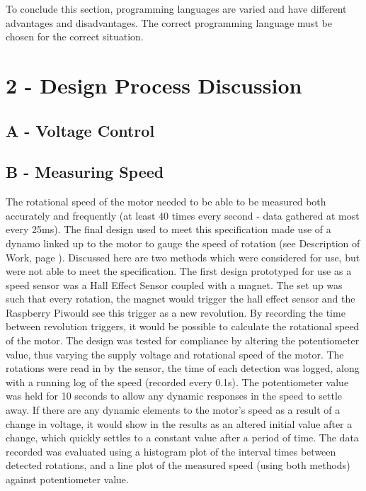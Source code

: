 \documentclass[a4]{report}
\def\br{\newline \newline \noindent}
\def\rpi{Raspberry Pi}
\begin{document}
	To conclude this section,  programming languages are varied and have different advantages and disadvantages. The correct programming language must be chosen for the correct situation.\newline \newline  \noindent

\section{2 - Design Process Discussion}
\subsection{A - Voltage Control}
\subsection{B - Measuring Speed}
The rotational speed of the motor needed to be able to be measured both accurately and frequently (at least 40 times every second - data gathered at most every 25ms). The final design used to meet this specification made use of a dynamo linked up to the motor to gauge the speed of rotation (see Description of Work, page \pageref{chap:dow}). Discussed here are two methods which were considered for use, but were not able to meet the specification.\br 
The first design prototyped for use as a speed sensor was a Hall Effect Sensor coupled with a magnet. The set up was such that every rotation, the magnet would trigger the hall effect sensor and the \rpi would see this trigger as a new revolution. By recording the time between revolution triggers, it would be possible to calculate the rotational speed of the motor. The design was tested for compliance by altering the potentiometer value, thus varying the supply voltage and rotational speed of the motor. The rotations were read in by the sensor, the time of each detection was logged, along with a running log of the speed (recorded every 0.1s). The potentiometer value was held for 10 seconds to allow any dynamic responses in the speed to settle away. If there are any dynamic elements to the motor's speed as a result of a change in voltage, it would show in the results as an altered initial value after a change, which quickly settles to a constant value after  a period of time. The data recorded was evaluated using a histogram plot of the interval times between detected rotations, and a line plot of the measured speed (using both methods) against potentiometer value. \newline \newline \noindent
\end{document}
